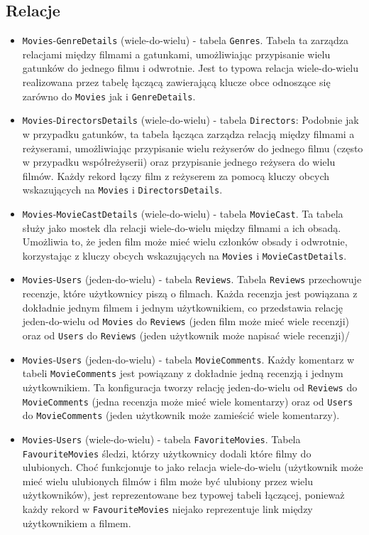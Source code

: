 \documentclass[../main.tex]{subfiles}
\begin{document}
\subsection{Relacje}
\begin{itemize}
	\item \texttt{Movies}-\texttt{GenreDetails} (wiele-do-wielu) - tabela \texttt{Genres}. Tabela ta zarządza relacjami między filmami a gatunkami, umożliwiając przypisanie wielu gatunków do jednego filmu i odwrotnie. Jest to typowa relacja wiele-do-wielu realizowana przez tabelę łączącą zawierającą klucze obce odnoszące się zarówno do \texttt{Movies} jak i \texttt{GenreDetails}.
	\item \texttt{Movies}-\texttt{DirectorsDetails} (wiele-do-wielu) - tabela \texttt{Directors}: Podobnie jak w przypadku gatunków, ta tabela łącząca zarządza relacją między filmami a reżyserami, umożliwiając przypisanie wielu reżyserów do jednego filmu (często w przypadku współreżyserii) oraz przypisanie jednego reżysera do wielu filmów. Każdy rekord łączy film z reżyserem za pomocą kluczy obcych wskazujących na \texttt{Movies} i \texttt{DirectorsDetails}.
	\item \texttt{Movies}-\texttt{MovieCastDetails} (wiele-do-wielu) - tabela \texttt{MovieCast}. Ta tabela służy jako mostek dla relacji wiele-do-wielu między filmami a ich obsadą. Umożliwia to, że jeden film może mieć wielu członków obsady i odwrotnie, korzystając z kluczy obcych wskazujących na \texttt{Movies} i \texttt{MovieCastDetails}.
	\item \texttt{Movies}-\texttt{Users} (jeden-do-wielu) - tabela \texttt{Reviews}. Tabela \texttt{Reviews} przechowuje recenzje, które użytkownicy piszą o filmach. Każda recenzja jest powiązana z dokładnie jednym filmem i jednym użytkownikiem, co przedstawia relację jeden-do-wielu od \texttt{Movies} do \texttt{Reviews} (jeden film może mieć wiele recenzji) oraz od \texttt{Users} do \texttt{Reviews} (jeden użytkownik może napisać wiele recenzji)/
	\item \texttt{Movies}-\texttt{Users} (jeden-do-wielu) - tabela \texttt{MovieComments}. Każdy komentarz w tabeli \texttt{MovieComments} jest powiązany z dokładnie jedną recenzją i jednym użytkownikiem. Ta konfiguracja tworzy relację jeden-do-wielu od \texttt{Reviews} do \texttt{MovieComments} (jedna recenzja może mieć wiele komentarzy) oraz od \texttt{Users} do \texttt{MovieComments} (jeden użytkownik może zamieścić wiele komentarzy).
	\item \texttt{Movies}-\texttt{Users} (wiele-do-wielu) - tabela \texttt{FavoriteMovies}. Tabela \linebreak \texttt{FavouriteMovies} śledzi, którzy użytkownicy dodali które filmy do ulubionych. Choć funkcjonuje to jako relacja wiele-do-wielu (użytkownik może mieć wielu ulubionych filmów i film może być ulubiony przez wielu użytkowników), jest reprezentowane bez typowej tabeli łączącej, ponieważ każdy rekord w \texttt{FavouriteMovies} niejako reprezentuje link między użytkownikiem a filmem.
\end{itemize}
\end{document}
